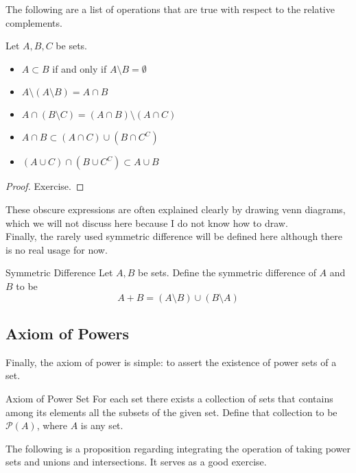 \documentclass[a4paper]{article}
\begin{document}
The following are a list of operations that are true with respect to the relative complements. 

\begin{prp}{}{} Let $A,B,C$ be sets. 
\begin{itemize}
\item $A\subset B$ if and only if $A\setminus B=\emptyset$
\item $A\setminus(A\setminus B)=A\cap B$
\item $A\cap (B\setminus C)=(A\cap B)\setminus(A\cap C)$
\item $A\cap B\subset(A\cap C)\cup(B\cap C^C)$
\item $(A\cup C)\cap(B\cup C^C)\subset A\cup B$
\end{itemize}
\begin{proof} Exercise. 
\end{proof}
\end{prp}

These obscure expressions are often explained clearly by drawing venn diagrams, which we will not discuss here because I do not know how to draw. \\

Finally, the rarely used symmetric difference will be defined here although there is no real usage for now. 

\begin{defn}{Symmetric Difference}{} Let $A,B$ be sets. Define the symmetric difference of $A$ and $B$ to be $$A+B=(A\setminus B)\cup(B\setminus A)$$
\end{defn}

\subsection{Axiom of Powers}
Finally, the axiom of power is simple: to assert the existence of power sets of a set. 

\begin{axm}{Axiom of Power Set}{} For each set there exists a collection of sets that contains among its elements all the subsets of the given set. Define that collection to be $\mathcal{P}(A)$, where $A$ is any set. 
\end{axm}

The following is a proposition regarding integrating the operation of taking power sets and unions and intersections. It serves as a good exercise. 
\end{document}
